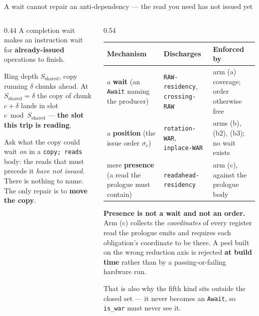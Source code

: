 \documentclass[aspectratio=169,9pt]{beamer}
\newcommand{\tsub}[1]{{\footnotesize\color{gray}#1}}
\newcommand{\key}[1]{\textcolor{acc}{\textbf{#1}}}
\newcommand{\bad}[1]{\textcolor{warn}{\textbf{#1}}}
\newcommand{\good}[1]{\textcolor{ok}{\textbf{#1}}}
\begin{document}
\begin{frame}{A wait cannot repair an anti-dependency --- the read you need has not issued yet}

\begin{columns}[T]
\begin{column}{0.44\textwidth}
\vspace{2pt}
A completion wait makes an instruction wait for \key{already-issued} operations to finish.

\vspace{4pt}
Ring depth $S_{\text{shared}}$, copy running $\delta$ chunks ahead. At $S_{\text{shared}}=\delta$ the copy of chunk $c+\delta$ lands in slot $c \bmod S_{\text{shared}}$ --- \bad{the slot this trip is reading}.

\vspace{4pt}
Ask what the copy could wait \emph{on} in a \texttt{copy; reads} body: the reads that must precede it \emph{have not issued}. There is nothing to name. The only repair is to \key{move the copy}.

\vspace{6pt}
\end{column}
\begin{column}{0.54\textwidth}
\vspace{-4pt}
\small
\begin{tabular}{@{}p{2.1cm}p{2.0cm}p{3.0cm}@{}}
\toprule
\textbf{Mechanism} & \textbf{Discharges} & \textbf{Enforced by} \\
\midrule
a \key{wait} \tsub{(an \texttt{Await} naming the producer)} & \texttt{RAW-residency}, \texttt{crossing-RAW} & arm (a) coverage; order otherwise free \\[4pt]
a \key{position} \tsub{(the issue order $\sigma_c$)} & \texttt{rotation-WAR}, \texttt{inplace-WAR} & arms (b), (b2), (b3); no wait exists \\[4pt]
mere \key{presence} \tsub{(a read the prologue must contain)} & \texttt{readahead-residency} & arm (c), against the prologue body \\
\bottomrule
\end{tabular}

\vspace{6pt}
\textbf{Presence is not a wait and not an order.} Arm (c) collects the \emph{coordinates} of every register read the prologue emits and requires each obligation's coordinate to be there. A peel built on the wrong reduction axis is rejected \good{at build time} rather than by a passing-or-failing hardware run.

\vspace{4pt}
\tsub{That is also why the fifth kind sits outside the closed set --- it never becomes an \texttt{Await}, so \texttt{is\_war} must never see it.}
\end{column}
\end{columns}
\end{frame}
\end{document}
